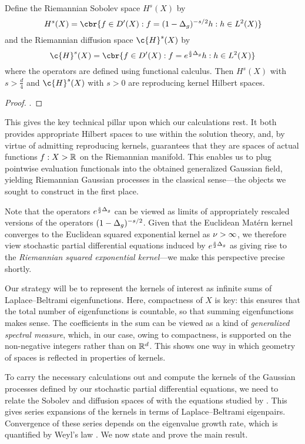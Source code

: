 \documentclass[11pt]{book}
\begin{document}
\begin{result}
\label{res:riemannian-sobolev}
Define the Riemannian Sobolev space $H^s(X)$ by
\[
H^s(X) = \cbr{f \in D'(X) : f = (1 - \lap_g)^{-s/2} h : h \in L^2(X)}
\]
and the Riemannian diffusion space $\c{H}^s(X)$ by
\[
\c{H}^s(X) = \cbr{f \in D'(X) : f = e^{\frac{s}{2}\lap_g} h : h \in L^2(X)}
\]
where the operators are defined using functional calculus.
Then $H^s(X)$ with $s > \frac{d}{4}$ and $\c{H}^s(X)$ with $s > 0$ are reproducing kernel Hilbert spaces.
\end{result}

\begin{proof}
\textcite[Theorem 3 and Theorem 6]{devito20}.
\end{proof}

This gives the key technical pillar upon which our calculations rest.
It both provides appropriate Hilbert spaces to use within the solution theory, and, by virtue of admitting reproducing kernels, guarantees that they are spaces of actual functions $f : X \-> \mathbb{R}$ on the Riemannian manifold.
This enables us to plug pointwise evaluation functionals into the obtained generalized Gaussian field, yielding Riemannian Gaussian processes in the classical sense---the objects we sought to construct in the first place.

Note that the operators $e^{\frac{s}{2}\Delta_g}$ can be viewed as limits of appropriately rescaled versions of the operators $(1 - \Delta_g)^{-s/2}$. 
Given that the Euclidean Matérn kernel converges to the Euclidean squared exponential kernel as $\nu\->\infty$, we therefore view stochastic partial differential equations induced by $e^{\frac{s}{2}\Delta_g}$ as giving rise to the \emph{Riemannian squared exponential kernel}---we make this perspective precise shortly.

Our strategy will be to represent the kernels of interest as infinite sums of Laplace--Beltrami eigenfunctions.
Here, compactness of $X$ is key: this ensures that the total number of eigenfunctions is countable, so that summing eigenfunctions makes sense.
The coefficients in the sum can be viewed as a kind of \emph{generalized spectral measure}, which, in our case, owing to compactness, is supported on the non-negative integers rather than on $\mathbb{R}^d$.
This shows one way in which geometry of spaces is reflected in properties of kernels.

To carry the necessary calculations out and compute the kernels of the Gaussian processes defined by our stochastic partial differential equations, we need to relate the Sobolev and diffusion spaces of \textcite{devito20} with the equations studied by \textcite{whittle54,whittle63,lindgren11}.
This gives series expansions of the kernels in terms of Laplace--Beltrami eigenpairs.
Convergence of these series depends on the eigenvalue growth rate, which is quantified by Weyl's law \cite{zelditch17}.
We now state and prove the main result.
\end{document}
